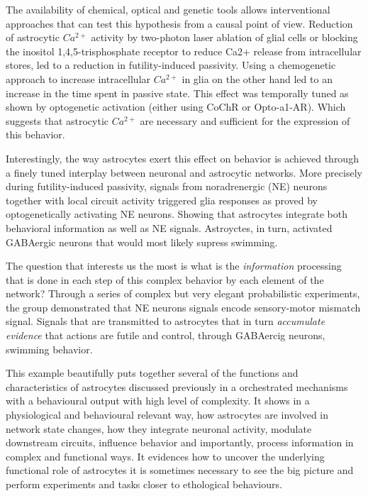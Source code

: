 The availability of chemical, optical and genetic tools allows interventional approaches that can test this hypothesis from a causal point of view. 
Reduction of astrocytic $Ca^{2+}$ activity by two-photon laser ablation of glial cells or blocking the inositol 1,4,5-trisphosphate receptor to reduce Ca2+ release from intracellular stores, led to a reduction in  futility-induced passivity. 
Using a chemogenetic approach to increase intracellular $Ca^{2+}$ in glia on the other hand led to an increase in the time spent in passive state. 
This effect was temporally tuned as shown by optogenetic activation (either using CoChR or Opto-a1-AR). 
Which suggests that astrocytic $Ca^{2+}$ are necessary and sufficient for the expression of this behavior. 

Interestingly, the way astrocytes exert this effect on behavior is achieved through a finely tuned interplay between neuronal and astrocytic networks. 
More precisely during futility-induced passivity, signals from noradrenergic (NE) neurons together with local circuit activity triggered glia responses as proved by optogenetically activating NE neurons. 
Showing that astrocytes integrate both behavioral information as well as NE signals.
Astroyctes, in turn, activated GABAergic neurons that would most likely supress swimming. 

The question that interests us the most is what is the \textit{information} processing that is done in each step of this complex behavior by each element of the network? 
Through a series of complex but very elegant probabilistic experiments, the group demonstrated that NE neurons signals encode sensory-motor mismatch signal.
Signals that are transmitted to astrocytes that in turn \textit{accumulate evidence} that actions are futile and control, through GABAercig neurons, swimming behavior. 

This example beautifully puts together several of the functions and characteristics of astrocytes discussed previously in a orchestrated mechanisms with a behavioural output with high level of complexity. 
It shows in a physiological and behavioural relevant way, how astrocytes are involved in network state changes, how they integrate neuronal activity, modulate downstream circuits, influence behavior and importantly, process information in complex and functional ways.  
It evidences how to uncover the underlying functional role of astrocytes it is sometimes necessary to see the big picture and perform experiments and tasks closer to ethological behaviours.  

